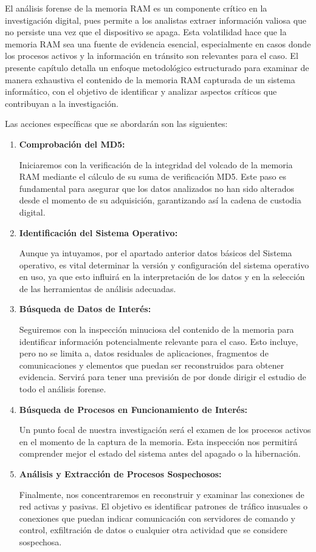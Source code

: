 El análisis forense de la memoria RAM es un componente crítico en la investigación digital, pues permite a los analistas extraer información valiosa que no persiste una vez que el dispositivo se apaga. Esta volatilidad hace que la memoria RAM sea una fuente de evidencia esencial, especialmente en casos donde los procesos activos y la información en tránsito son relevantes para el caso. El presente capítulo detalla un enfoque metodológico estructurado para examinar de manera exhaustiva el contenido de la memoria RAM capturada de un sistema informático, con el objetivo de identificar y analizar aspectos críticos que contribuyan a la investigación.

Las acciones específicas que se abordarán son las siguientes:

\begin{enumerate}
    \item  \textbf{Comprobación del MD5:}

    Iniciaremos con la verificación de la integridad del volcado de la memoria RAM mediante el cálculo de su suma de verificación MD5. Este paso es fundamental para asegurar que los datos analizados no han sido alterados desde el momento de su adquisición, garantizando así la cadena de custodia digital.

    \item \textbf{Identificación del Sistema Operativo:}

    Aunque ya intuyamos, por el apartado anterior datos básicos del Sistema operativo, es vital determinar la versión y configuración del sistema operativo en uso, ya que esto influirá en la interpretación de los datos y en la selección de las herramientas de análisis adecuadas.

    \item \textbf{Búsqueda de Datos de Interés:}

    Seguiremos con la inspección minuciosa del contenido de la memoria para identificar información potencialmente relevante para el caso. Esto incluye, pero no se limita a, datos residuales de aplicaciones, fragmentos de comunicaciones y elementos que puedan ser reconstruidos para obtener evidencia. Servirá para tener una previsión de por donde dirigir el estudio de todo el análisis forense.


    \item \textbf{Búsqueda de Procesos en Funcionamiento de Interés:}

    Un punto focal de nuestra investigación será el examen de los procesos activos en el momento de la captura de la memoria. Esta inspección nos permitirá comprender mejor el estado del sistema antes del apagado o la hibernación.

    \item \textbf{Análisis y Extracción de Procesos Sospechosos:}

    Finalmente, nos concentraremos en reconstruir y examinar las conexiones de red activas y pasivas. El objetivo es identificar patrones de tráfico inusuales o conexiones que puedan indicar comunicación con servidores de comando y control, exfiltración de datos o cualquier otra actividad que se considere sospechosa.

\end{enumerate}

